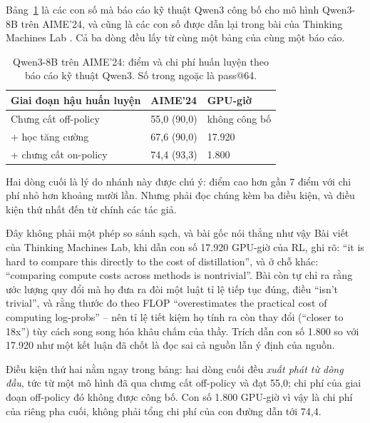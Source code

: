 Bảng~\ref{tab:opd_qwen3_cost} là các con số mà báo cáo kỹ thuật Qwen3 \cite{yang2025qwen3} công bố cho mô hình Qwen3-8B trên AIME'24, và cũng là các con số được dẫn lại trong bài của Thinking Machines Lab \cite{lu2025opd}. Cả ba dòng đều lấy từ cùng một bảng của cùng một báo cáo.

\begin{table}[H]
\centering\small
\caption{Qwen3-8B trên AIME'24: điểm và chi phí huấn luyện theo báo cáo kỹ thuật Qwen3. Số trong ngoặc là pass@64.}
\label{tab:opd_qwen3_cost}
\begin{tabularx}{\textwidth}{@{}Xll@{}}
\toprule
\textbf{Giai đoạn hậu huấn luyện} & \textbf{AIME'24} & \textbf{GPU-giờ} \\
\midrule
Chưng cất off-policy & 55,0 (90,0) & không công bố \\
\quad + học tăng cường & 67,6 (90,0) & 17.920 \\
\quad + chưng cất on-policy & 74,4 (93,3) & 1.800 \\
\bottomrule
\end{tabularx}
\end{table}

Hai dòng cuối là lý do nhánh này được chú ý: điểm cao hơn gần 7 điểm với chi phí nhỏ hơn khoảng mười lần. Nhưng phải đọc chúng kèm ba điều kiện, và điều kiện thứ nhất đến từ chính các tác giả.

\begin{pitfall}{Đây không phải một phép so sánh sạch, và bài gốc nói thẳng như vậy}
Bài viết của Thinking Machines Lab, khi dẫn con số 17.920 GPU-giờ của RL, ghi rõ: ``it is hard to compare this directly to the cost of distillation'', và ở chỗ khác: ``comparing compute costs across methods is nontrivial''. Bài còn tự chỉ ra rằng ước lượng quy đổi mà họ đưa ra đòi một luật tỉ lệ tiếp tục đúng, điều ``isn't trivial'', và rằng thước đo theo FLOP ``overestimates the practical cost of computing log-probs'' -- nên tỉ lệ tiết kiệm họ tính ra còn thay đổi (``closer to 18x'') tùy cách song song hóa khâu chấm của thầy. Trích dẫn con số 1.800 so với 17.920 như một kết luận đã chốt là đọc sai cả nguồn lẫn ý định của nguồn.
\end{pitfall}

Điều kiện thứ hai nằm ngay trong bảng: hai dòng cuối đều \emph{xuất phát từ dòng đầu}, tức từ một mô hình đã qua chưng cất off-policy và đạt 55,0; chi phí của giai đoạn off-policy đó không được công bố. Con số 1.800 GPU-giờ vì vậy là chi phí của riêng pha cuối, không phải tổng chi phí của con đường dẫn tới 74,4.

